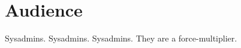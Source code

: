 \section{Audience}
\label{sec:audience}

Sysadmins. Sysadmins. Sysadmins. They are a force-multiplier.





